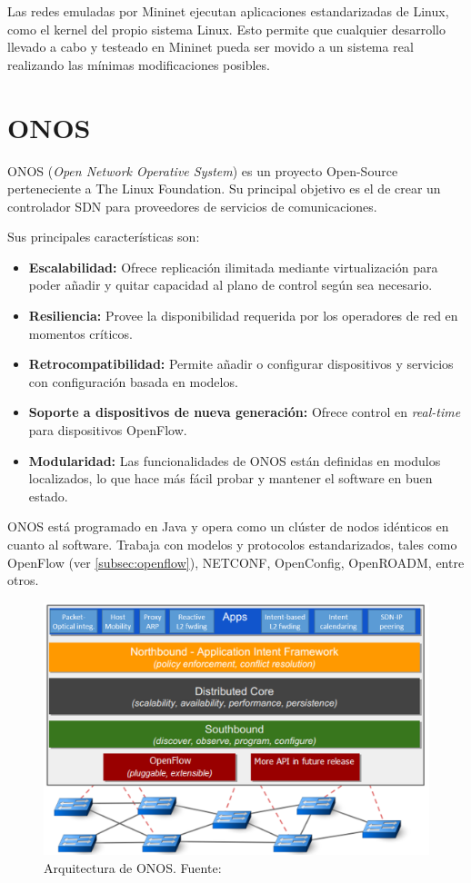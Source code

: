 Las redes emuladas por Mininet ejecutan aplicaciones estandarizadas de Linux, como el kernel del propio sistema Linux. Esto permite que cualquier desarrollo llevado a cabo y testeado en Mininet pueda ser movido a un sistema real realizando las mínimas modificaciones posibles.

\section{ONOS}
\label{sec:onos}

ONOS (\textit{Open Network Operative System})\cite{onosbib} es un proyecto Open-Source perteneciente a The Linux Foundation. Su principal objetivo es el de crear un controlador SDN para proveedores de servicios de comunicaciones.

Sus principales características son:
\begin{itemize}
	\item \textbf{Escalabilidad:} Ofrece replicación ilimitada mediante virtualización para poder añadir y quitar capacidad al plano de control según sea necesario.
	\item \textbf{Resiliencia:} Provee la disponibilidad requerida por los operadores de red en momentos críticos.
	\item \textbf{Retrocompatibilidad:} Permite añadir o configurar dispositivos y servicios con configuración basada en modelos.
	\item \textbf{Soporte a dispositivos de nueva generación:} Ofrece control en \textit{real-time} para dispositivos OpenFlow.
	\item \textbf{Modularidad:} Las funcionalidades de ONOS están definidas en modulos localizados, lo que hace más fácil probar y mantener el software en buen estado.
\end{itemize}


ONOS está programado en Java y opera como un clúster de nodos idénticos en cuanto al software. Trabaja con modelos y protocolos estandarizados, tales como OpenFlow (ver \ref{subsec:openflow}), NETCONF, OpenConfig, OpenROADM, entre otros.

\clearpage


\begin{figure}[!ht]
	\centering
	\includegraphics[width=0.7\linewidth]{imagenes/onos_architecture}
	\caption{Arquitectura de ONOS. 
		Fuente: \cite{onostutbib}}
	\label{fig:onosarch}
\end{figure}

